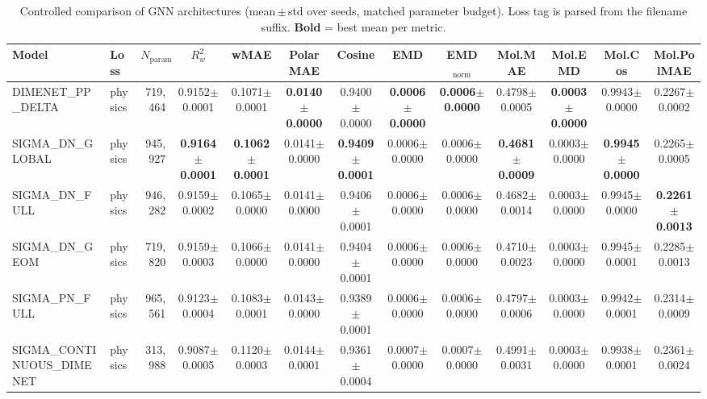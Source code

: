 \begin{table}[ht]
\centering
\caption{Controlled comparison of GNN architectures (mean\,$\pm$\,std over seeds, matched parameter budget). Loss tag is parsed from the filename suffix. \textbf{Bold} = best mean per metric.}
\label{tab:benchmark}
\small
\begin{tabular}{l l r c c c c c c c c c c }
\toprule
Model & Loss & $N_{\text{params}}$ & $R^2_w$ & wMAE & PolarMAE & Cosine & EMD & EMD$_\mathrm{norm}$ & Mol.MAE & Mol.EMD & Mol.Cos & Mol.PolMAE \\
\midrule
DIMENET_PP_DELTA & physics & 719,464 & 0.9152$\pm$0.0001 & 0.1071$\pm$0.0001 & \textbf{0.0140$\pm$0.0000} & 0.9400$\pm$0.0000 & \textbf{0.0006$\pm$0.0000} & \textbf{0.0006$\pm$0.0000} & 0.4798$\pm$0.0005 & \textbf{0.0003$\pm$0.0000} & 0.9943$\pm$0.0000 & 0.2267$\pm$0.0002 \\
SIGMA_DN_GLOBAL & physics & 945,927 & \textbf{0.9164$\pm$0.0001} & \textbf{0.1062$\pm$0.0001} & 0.0141$\pm$0.0000 & \textbf{0.9409$\pm$0.0001} & 0.0006$\pm$0.0000 & 0.0006$\pm$0.0000 & \textbf{0.4681$\pm$0.0009} & 0.0003$\pm$0.0000 & \textbf{0.9945$\pm$0.0000} & 0.2265$\pm$0.0005 \\
SIGMA_DN_FULL & physics & 946,282 & 0.9159$\pm$0.0002 & 0.1065$\pm$0.0000 & 0.0141$\pm$0.0000 & 0.9406$\pm$0.0001 & 0.0006$\pm$0.0000 & 0.0006$\pm$0.0000 & 0.4682$\pm$0.0014 & 0.0003$\pm$0.0000 & 0.9945$\pm$0.0000 & \textbf{0.2261$\pm$0.0013} \\
SIGMA_DN_GEOM & physics & 719,820 & 0.9159$\pm$0.0003 & 0.1066$\pm$0.0000 & 0.0141$\pm$0.0000 & 0.9404$\pm$0.0001 & 0.0006$\pm$0.0000 & 0.0006$\pm$0.0000 & 0.4710$\pm$0.0023 & 0.0003$\pm$0.0000 & 0.9945$\pm$0.0001 & 0.2285$\pm$0.0013 \\
SIGMA_PN_FULL & physics & 965,561 & 0.9123$\pm$0.0004 & 0.1083$\pm$0.0001 & 0.0143$\pm$0.0000 & 0.9389$\pm$0.0001 & 0.0006$\pm$0.0000 & 0.0006$\pm$0.0000 & 0.4797$\pm$0.0006 & 0.0003$\pm$0.0000 & 0.9942$\pm$0.0001 & 0.2314$\pm$0.0009 \\
SIGMA_CONTINUOUS_DIMENET & physics & 313,988 & 0.9087$\pm$0.0005 & 0.1120$\pm$0.0003 & 0.0144$\pm$0.0001 & 0.9361$\pm$0.0004 & 0.0007$\pm$0.0000 & 0.0007$\pm$0.0000 & 0.4991$\pm$0.0031 & 0.0003$\pm$0.0000 & 0.9938$\pm$0.0001 & 0.2361$\pm$0.0024 \\
\bottomrule
\end{tabular}
\end{table}
